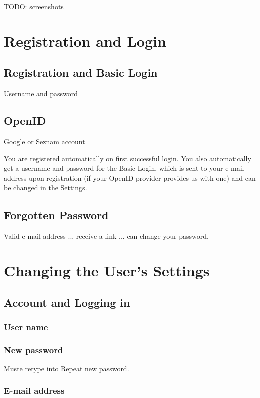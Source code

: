 \label{chap:users_manual}

TODO: screenshots

\section{Registration and Login}

\subsection{Registration and Basic Login}

Username and password

\subsection{OpenID}

Google or Seznam account

You are registered automatically on first successful login. You also automatically get a username and password for the Basic Login, which is sent to your e-mail address upon registration (if your OpenID provider provides us with one) and can be changed in the Settings.

\subsection{Forgotten Password}

Valid e-mail address ... receive a link ... can change your password.

\section{Changing the User's Settings}

\subsection{Account and Logging in}
\subsubsection{User name}
\subsubsection{New password}

Muste retype into Repeat new password.

\subsubsection{E-mail address}

